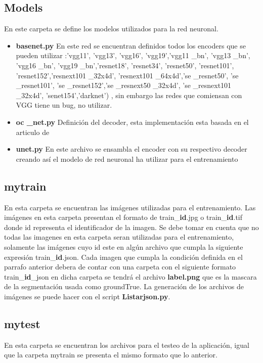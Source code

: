\subsection{Models}
En este carpeta se define los modelos utilizados para la red neuronal.
\begin{itemize}
    \item \textbf{basenet.py} En este red se encuentran definidos todos los encoders que se pueden utilizar :'vgg11', 'vgg13', 'vgg16', 'vgg19','vgg11 \_bn', 'vgg13 \_bn', 'vgg16 \_bn', 'vgg19 \_bn','resnet18', 'resnet34', 'resnet50', 'resnet101', 'resnet152','resnext101 \_32x4d', 'resnext101 \_64x4d','se \_resnet50', 'se \_resnet101', 'se \_resnet152','se \_resnext50 \_32x4d', 'se \_resnext101 \_32x4d', 'senet154','darknet') , sin embargo las redes que comiensan con VGG tiene un bug, no utilizar.
    \item  \textbf{oc \_net.py} Definición del decoder, esta implementación esta basada en el articulo de \cite{yuan2018ocnet}
    \item \textbf{unet.py} En este archivo se ensambla el encoder con su respectivo decoder creando así el modelo de red neuronal ha utilizar para el entrenamiento
\end{itemize}
\subsection{mytrain}
\label{sub:mytrain}
En esta carpeta se encuentran las imágenes utilizadas para el entrenamiento. Las imágenes en esta carpeta presentan el formato de train\_\textbf{id}.jpg o train\_\textbf{id}.tif donde id representa el identificador de la imagen. Se debe tomar en cuenta que no todas las imagenes en esta carpeta seran utilizadas para el entrenamiento, solamente las imágenes cuyo id este en algún archivo que cumpla la siguiente expresión train\_\textbf{id}.json. 
Cada imagen que cumpla la condición definida en el parrafo anterior debera de contar con una carpeta con el siguiente formato train\_\textbf{id}\_json  en dicha carpeta se tendrá el archivo \textbf{label.png} que es la mascara de la segmentación usada como groundTrue. La generación de los archivos de imágenes se puede hacer con el script \textbf{Listarjson.py}.
\subsection{mytest}
\label{sub:mytest}
En esta carpeta se encuentran los archivos para el testeo de la aplicación, igual que la carpeta mytrain se presenta el mismo formato que lo anterior.

